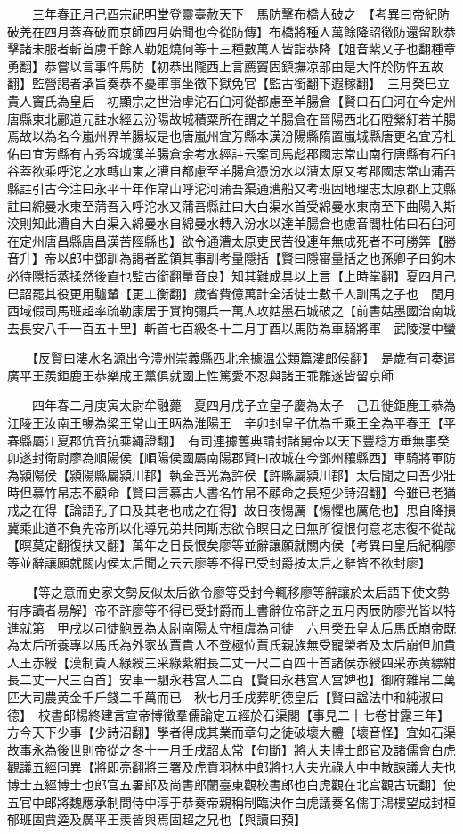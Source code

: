 　　三年春正月己酉宗祀明堂登靈臺赦天下　馬防擊布橋大破之　【考異曰帝紀防破羌在四月蓋春破而京師四月始聞也今從防傳】布橋將種人萬餘降詔徵防還留耿恭擊諸未服者斬首虜千餘人勒姐燒何等十三種數萬人皆詣恭降【姐音紫又子也翻種章勇翻】恭嘗以言事忤馬防【初恭出隴西上言薦竇固鎮撫凉部由是大忤於防忤五故翻】監營謁者承旨奏恭不憂軍事坐徵下獄免官【監古銜翻下遐稼翻】　三月癸巳立貴人竇氏為皇后　初顯宗之世治虖沱石臼河從都慮至羊腸倉【賢曰石臼河在今定州唐縣東北酈道元註水經云汾陽故城積粟所在謂之羊腸倉在晉陽西北石隥縈紆若羊腸焉故以為名今嵐州界羊腸坂是也唐嵐州宜芳縣本漢汾陽縣隋置嵐城縣唐更名宜芳杜佑曰宜芳縣有古秀容城漢羊腸倉余考水經註云案司馬彪郡國志常山南行唐縣有石臼谷蓋欲乘呼沱之水轉山東之漕自都慮至羊腸倉憑汾水以漕太原又考郡國志常山蒲吾縣註引古今注曰永平十年作常山呼沱河蒲吾渠通漕船又考班固地理志太原郡上艾縣註曰綿曼水東至蒲吾入呼沱水又蒲吾縣註曰大白渠水首受綿曼水東南至下曲陽入斯洨則知此漕自大白渠入綿曼水自綿曼水轉入汾水以達羊腸倉也慮音閭杜佑曰石臼河在定州唐昌縣唐昌漢苦陘縣也】欲令通漕太原吏民苦役連年無成死者不可勝筭【勝音升】帝以郎中鄧訓為謁者監領其事訓考量隱括【賢曰隱審量括之也孫卿子曰鉤木必待隱括蒸揉然後直也監古銜翻量音良】知其難成具以上言【上時掌翻】夏四月己巳詔罷其役更用驢輦【更工衡翻】歲省費億萬計全活徒士數千人訓禹之子也　閏月西域假司馬班超率疏勒康居于窴拘彌兵一萬人攻姑墨石城破之【前書姑墨國治南城去長安八千一百五十里】斬首七百級冬十二月丁酉以馬防為車騎將軍　武陵漊中蠻

　　【反賢曰漊水名源出今澧州崇義縣西北余據温公類篇漊郎侯翻】　是歲有司奏遣廣平王羨鉅鹿王恭樂成王黨俱就國上性篤愛不忍與諸王乖離遂皆留京師

　　四年春二月庚寅太尉牟融薨　夏四月戊子立皇子慶為太子　己丑徙鉅鹿王恭為江陵王汝南王暢為梁王常山王昞為淮陽王　辛卯封皇子伉為千乘王全為平春王【平春縣屬江夏郡伉音抗乘繩證翻】　有司連據舊典請封諸舅帝以天下豐稔方垂無事癸卯遂封衛尉廖為順陽侯【順陽侯國屬南陽郡賢曰故城在今鄧州穰縣西】車騎將軍防為潁陽侯【潁陽縣屬潁川郡】執金吾光為許侯【許縣屬潁川郡】太后聞之曰吾少壯時但慕竹帛志不顧命【賢曰言慕古人書名竹帛不顧命之長短少詩沼翻】今雖已老猶戒之在得【論語孔子曰及其老也戒之在得】故日夜惕厲【惕懼也厲危也】思自降損冀乘此道不負先帝所以化導兄弟共同斯志欲令瞑目之日無所復恨何意老志復不從哉【暝莫定翻復扶又翻】萬年之日長恨矣廖等並辭讓願就關内侯【考異曰皇后紀稱廖等並辭讓願就關内侯太后聞之云云廖等不得已受封爵按太后之辭皆不欲封廖】

　　【等之意而史家文勢反似太后欲令廖等受封今輒移廖等辭讓於太后語下使文勢有序讀者易解】帝不許廖等不得已受封爵而上書辭位帝許之五月丙辰防廖光皆以特進就第　甲戌以司徒鮑昱為太尉南陽太守桓虞為司徒　六月癸丑皇太后馬氏崩帝既為太后所養專以馬氏為外家故賈貴人不登極位賈氏親族無受寵榮者及太后崩但加貴人王赤綬【漢制貴人綠綬三采綠紫紺長二丈一尺二百四十首諸侯赤綬四采赤黄縹紺長二丈一尺三百首】安車一駟永巷宫人二百【賢曰永巷宫人宫婢也】御府雜帛二萬匹大司農黄金千斤錢二千萬而已　秋七月壬戌葬明德皇后【賢曰諡法中和純淑曰德】　校書郎楊終建言宣帝博徵羣儒論定五經於石渠閣【事見二十七卷甘露三年】方今天下少事【少詩沼翻】學者得成其業而章句之徒破壞大體【壞音怪】宜如石渠故事永為後世則帝從之冬十一月壬戌詔太常【句斷】將大夫博士郎官及諸儒會白虎觀議五經同異【將即亮翻將三署及虎賁羽林中郎將也大夫光祿大中中散諫議大夫也博士五經博士也郎官五署郎及尚書郎蘭臺東觀校書郎也白虎觀在北宫觀古玩翻】使五官中郎將魏應承制問侍中淳于恭奏帝親稱制臨決作白虎議奏名儒丁鴻樓望成封桓郁班固賈逵及廣平王羨皆與焉固超之兄也【與讀曰預】

